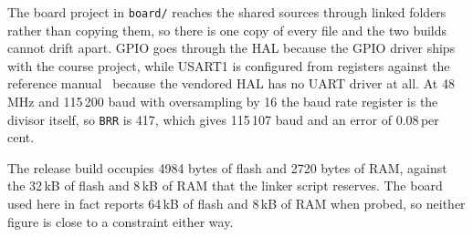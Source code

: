 The board project in \texttt{board/} reaches the shared sources through linked
folders rather than copying them, so there is one copy of every file and the
two builds cannot drift apart. GPIO goes through the HAL because the GPIO
driver ships with the course project, while USART1 is configured from registers
against the reference manual~\cite{rm0091} because the vendored HAL has no UART
driver at all. At 48\,MHz and 115\,200 baud with oversampling by 16 the baud
rate register is the divisor itself, so \texttt{BRR} is 417, which gives
115\,107 baud and an error of 0.08\,per cent.

The release build occupies 4984 bytes of flash and 2720 bytes of RAM, against
the 32\,kB of flash and 8\,kB of RAM that the linker script reserves. The board
used here in fact reports 64\,kB of flash and 8\,kB of RAM when probed, so
neither figure is close to a constraint either way.
